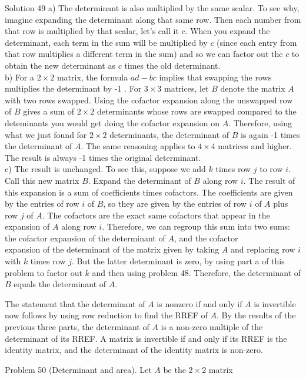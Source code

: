 \documentclass[10pt]{article}
\begin{document}
Solution 49 a) The determinant is also multiplied by the same scalar. To see why, imagine expanding the determinant along that same row. Then each number from that row is multiplied by that scalar, let's call it $c$. When you expand the determinant, each term in the sum will be multiplied by $c$ (since each entry from that row multiplies a different term in the sum) and so we can factor out the $c$ to obtain the new determinant as $c$ times the old determinant.\\
b) For a $2 \times 2$ matrix, the formula $a d-b c$ implies that swapping the rows multiplies the determinant by -1 . For $3 \times 3$ matrices, let $B$ denote the matrix $A$ with two rows swapped. Using the cofactor expansion along the unswapped row of $B$ gives a sum of $2 \times 2$ determinants whose rows are swapped compared to the deteminants you would get doing the cofactor expansion on $A$. Therefore, using what we just found for $2 \times 2$ determinants, the determinant of $B$ is again -1 times the determinant of $A$. The same reasoning applies to $4 \times 4$ matrices and higher. The result is always -1 times the original determinant.\\
c) The result is unchanged. To see this, suppose we add $k$ times row $j$ to row $i$. Call this new matrix $B$. Expand the determinant of $B$ along row $i$. The result of this expansion is a sum of coefficients times cofactors. The coefficients are given by the entries of row $i$ of $B$, so they are given by the entries of row $i$ of $A$ plus row $j$ of $A$. The cofactors are the exact same cofactors that appear in the expansion of $A$ along row $i$. Therefore, we can regroup this sum into two sums: the cofactor expansion of the determinant of $A$, and the cofactor\\
expansion of the determinant of the matrix given by taking $A$ and replacing row $i$ with $k$ times row $j$. But the latter determinant is zero, by using part a of this problem to factor out $k$ and then using problem 48. Therefore, the determinant of $B$ equals the determinant of $A$.

The statement that the determinant of $A$ is nonzero if and only if $A$ is invertible now follows by using row reduction to find the RREF of $A$. By the results of the previous three parts, the determinant of $A$ is a non-zero multiple of the determinant of its RREF. A matrix is invertible if and only if its RREF is the identity matrix, and the determinant of the identity matrix is non-zero.

Problem 50 (Determinant and area). Let $A$ be the $2 \times 2$ matrix
\end{document}
